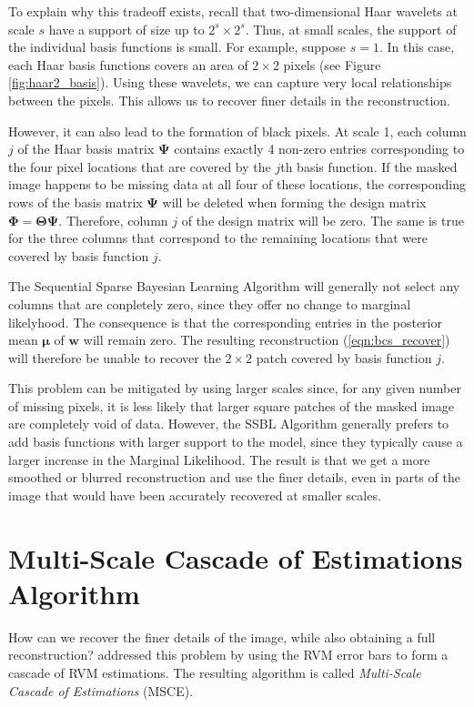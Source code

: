 To explain why this tradeoff exists, recall that two-dimensional Haar wavelets at scale $s$ have a support of size up to $2^s\times 2^s$.
Thus, at small scales, the support of the individual basis functions is small.
For example, suppose $s=1$.
In this case, each Haar basis functions covers an area of $2\times 2$ pixels (see Figure \ref{fig:haar2_basis}).
Using these wavelets, we can capture very local relationships between the pixels.
This allows us to recover finer details in the reconstruction.

However, it can also lead to the formation of black pixels.
At scale 1, each column $j$ of the Haar basis matrix $\bm \Psi$ contains exactly 4 non-zero entries corresponding to the four pixel locations that are covered by the $j$th basis function.
If the masked image happens to be missing data at all four of these locations, the corresponding rows of the basis matrix $\bm\Psi$ will be deleted when forming the design matrix $\bm\Phi=\bm\Theta\bm\Psi$.
Therefore, column $j$ of the design matrix will be zero.
The same is true for the three columns that correspond to the remaining locations that were covered by basis function $j$.

The Sequential Sparse Bayesian Learning Algorithm will generally not select any columns that are conpletely zero, since they offer no change to marginal likelyhood.
The consequence is that the corresponding entries in the posterior mean $\bm\mu$ of $\bm w$ will remain zero.
The resulting reconstruction (\ref{eqn:bcs_recover}) will therefore be unable to recover the $2\times 2$ patch covered by basis function $j$.

This problem can be mitigated by using larger scales since, for any given number of missing pixels, it is less likely that larger square patches of the masked image are completely void of data.
However, the SSBL Algorithm generally prefers to add basis functions with larger support to the model, since they typically cause a larger increase in the Marginal Likelihood.
The result is that we get a more smoothed or blurred reconstruction and use the finer details, even in parts of the image that would have been accurately recovered at smaller scales.

\section{Multi-Scale Cascade of Estimations Algorithm}
How can we recover the finer details of the image, while also obtaining a full reconstruction?
\cite{pilikos2014} addressed this problem by using the RVM error bars to form a cascade of RVM estimations.
The resulting algorithm is called \emph{Multi-Scale Cascade of Estimations} (MSCE).

